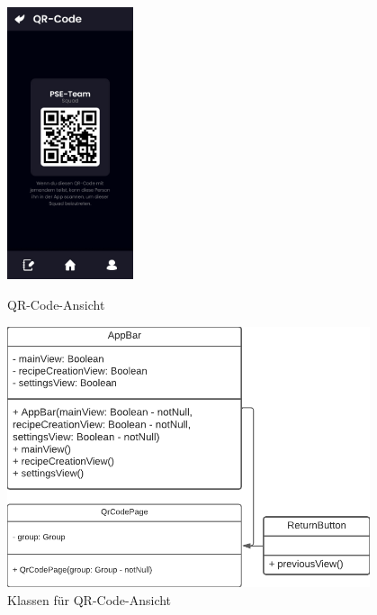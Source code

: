\documentclass[parskip=full]{scrartcl}
\begin{document}
\begin{figure}[htp]
    \begin{minipage}
        [t]{0.49\textwidth}
        \centering
        \includegraphics[height=80mm]{images/Presentation-layer/QRCodeView.jpg}
        \caption{QR-Code-Ansicht}
    \end{minipage}
    \begin{minipage}
        [t]{0.49\textwidth}
        \centering
        \includegraphics[width=0.95\textwidth]{images/Presentation-layer/QRCodeViewClass.pdf}
        \caption{Klassen für QR-Code-Ansicht}
    \end{minipage}
\end{figure}
\newpage

\newpage
\end{document}

